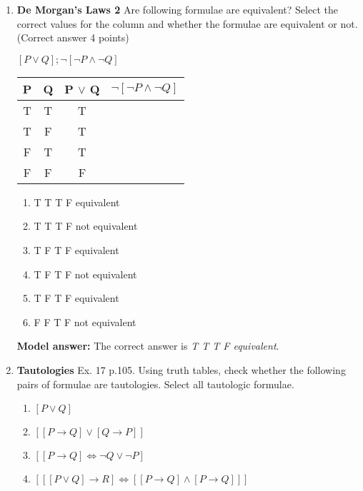 \documentclass[a4,11pt]{article}
\begin{document}
\begin{enumerate}[leftmargin = 12pt]
\begin{tabular}{c | c | c | c | c | c | c}
\end{tabular}

{ \bf Model answer:} Two formulae are equivalent if they are have the same truth values under the exact same circumstances. $\neg$ (P $\land$ Q) is True whenever ($\neg$ P $\lor$ $\neg$ Q) is True, namely when either P or Q or both P and Q are false. $\neg$ (P $\land$ Q) is False whenever  ($\neg$ P $\lor$ $\neg$ Q) is False, namely when P and Q are true. Since the two formulae are true/false under the same circumstances, they are equivalent.




\item {\bf De Morgan's Laws 2} Are following formulae are equivalent? Select the correct values for the column and whether the formulae are equivalent or not. (Correct answer 4 points)

 $[P \lor Q]; \neg [ \neg P \land \neg Q]$


\begin{tabular}{c | c | c | c }
\hline \hline
P & Q & P $\lor$ Q & $\neg [ \neg P \land \neg Q]$ \\
\hline \hline
T & T & T \\
T & F & T \\
F & T & T \\
F & F & F \\
\hline \hline
\end{tabular}

\begin{enumerate}
\item T T T F equivalent
\item T T T F not equivalent
\item T F T F equivalent
\item T F T F not equivalent
\item T F T F equivalent
\item F F T F not equivalent
\end{enumerate}


{ \bf Model answer:} The correct answer is {\it T T T F equivalent}.

\item {\bf Tautologies} Ex. 17 p.105. Using truth tables, check whether the following pairs of formulae are tautologies. Select all tautologic formulae.

\begin{enumerate}
\item $[P \lor Q]$
\item $[[P\rightarrow Q]  \lor  [Q \rightarrow P]]$
\item $[[P \rightarrow Q] \iff \neg Q \lor \neg P ]$ 
\item $[[[P \lor Q] \rightarrow  R] \iff [[P \rightarrow Q] \land [P \rightarrow  Q]]]$
\end{enumerate}



\end{enumerate}
\end{document}
